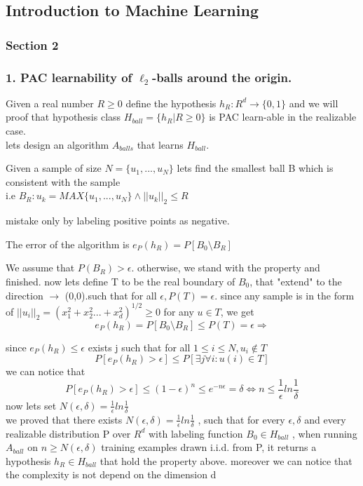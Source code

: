 \documentclass[12pt]{article}
\theoremstyle{plain}
\begin{document}
\begin{center}
\section*{Introduction to Machine Learning}
\subsubsection*{Section 2}
\end{center}
\subsubsection*{ 1. PAC learnability of $\ell_2$-balls around the origin. }
Given a real number
$R \geq 0$ define the hypothesis $h_R : R^d \rightarrow \lbrace 0, 1\rbrace $
and we will proof that hypothesis class $H_{ball} = \lbrace h_R | R \geq 0\rbrace$ is PAC learn-able in the realizable case.\\
lets design an algorithm $A_{balls}$ that learns $H_{ball}$.\begin{list}{•}
 \item Given a sample of size $N = \lbrace u_1, . . . , u_N \rbrace$ lets find the smallest ball B
 which is consistent with the sample\\
 i.e $B_{R}:u_k=MAX\lbrace u_1, . . . , u_N\rbrace  \wedge ||u_k||_2 \leq R $
  \item mistake only by labeling positive points as negative.
 \item The error of the algorithm is $e_P (h_R) = P [B_0 \setminus B_{R}]$
\end{list}
We assume that $P(B_{R}) > \epsilon $. otherwise, we stand with the property and finished.
now lets define T to be the real boundary of $B_0$, that "extend" to the direction $\rightarrow$ (0,0).such that for all $\epsilon ,P(T)=\epsilon$.
since any sample is in the form of $||u_i||_2=(x_1^2+x_2^2...+x_d^2)^{1/2} \geq 0$ for any $u \in T$, we get 
\[
e_P (h_R) = P [B_0 \setminus B_R] \leq P(T)=\epsilon \Rightarrow
\]

since $e_P (h_R)\leq \epsilon $ exists j such
that for all $ 1 \leq i \leq N, u_i \notin T $
\[ 
 P [  e_P(h_R) > \epsilon] \leq P [ 
\exists j  \forall i : u
(i) \in T ]
 \]
we can notice that
\[ 
 P [  e_P(h_R) > \epsilon] \leq (1-\epsilon )^n \leq e^{-n\epsilon} = \delta 
\Leftrightarrow n \leq \frac{1}{\epsilon}ln\frac{1}{\delta}
 \]
 now lets set $N(\epsilon ,\delta)=\frac{1}{\epsilon}ln\frac{1}{\delta}$ \\
 we proved that there exists $N(\epsilon ,\delta)=\frac{1}{\epsilon}ln\frac{1}{\delta}$
, such that for
every $\epsilon, \delta$ and every realizable distribution P over $R^d$ with
labeling function $B_0 \in H_{ball}$
, when running $A_{ball}$ on
$n \geq N(\epsilon ,\delta )$ training examples drawn i.i.d. from P, it
returns a hypothesis $h_R \in H_{ball}$ 
 that hold the property above.
 moreover  we can notice that the complexity is not depend on the dimension d\pagebreak
\end{document}
